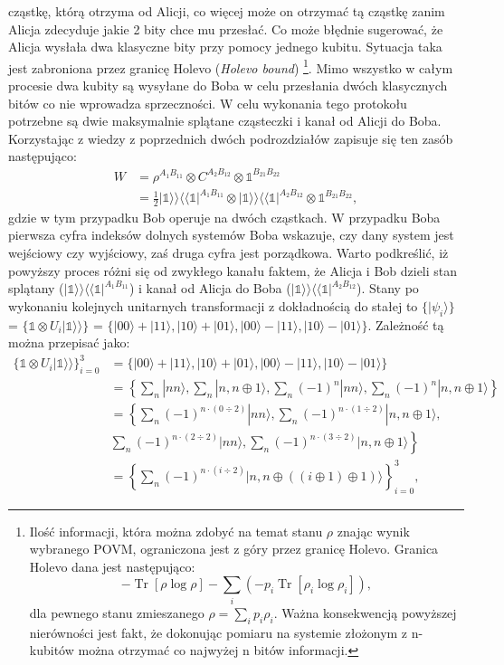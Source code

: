 \documentclass[10pt]{article} %
\DeclareMathOperator{\Trs}{Tr}
\newcommand{\Ket}[1]{|#1\rangle}
\newcommand{\BBra}[1]{\langle\langle#1|}
\newcommand{\KKet}[1]{|#1\rangle\rangle}
\newcommand{\I}{\mathbb{1}}
\begin{document}
cząstkę, którą otrzyma od Alicji, co więcej może on otrzymać tą cząstkę zanim Alicja zdecyduje jakie 2 bity chce mu przesłać. Co może błędnie sugerować, że Alicja wysłała dwa klasyczne bity przy pomocy jednego kubitu. Sytuacja taka jest zabroniona przez granicę Holevo (\textit{Holevo bound})
\footnote
{
Ilość informacji, która można zdobyć na temat stanu $\rho$ znając wynik wybranego POVM, ograniczona jest z góry przez granicę Holevo. Granica Holevo dana jest następująco:
\[
-\Trs\left[\rho \log \rho\right] - \sum_i \left(-p_i \Trs \left[ \rho_i \log \rho_i \right]\right),
\]
dla pewnego stanu zmieszanego $\rho = \sum_i p_i \rho_i$. Ważna konsekwencją powyższej nierówności jest fakt, że dokonując pomiaru na systemie złożonym z n-kubitów można otrzymać co najwyżej n bitów informacji.
}. Mimo wszystko w całym procesie dwa kubity są wysyłane do Boba w celu przesłania dwóch klasycznych bitów co nie wprowadza sprzeczności.
W celu wykonania tego protokołu potrzebne są dwie maksymalnie splątane cząsteczki i kanał od Alicji do Boba. Korzystając z wiedzy z poprzednich dwóch podrozdziałów zapisuje się ten zasób następująco:
\begin{equation}
\begin{split}
W &=  \rho^{A_1 B_{11}} \otimes C^{A_2 B_{12}} \otimes \I^{B_{21}B_{22}} \\&=\frac{1}{2}\KKet{\I}\BBra{\I}^{A_1B_{11}} \otimes \KKet{\I}\BBra{\I}^{A_2B_{12}} \otimes \I^{B_{21}B_{22}},
\end{split}
\end{equation} gdzie w tym przypadku Bob operuje na dwóch cząstkach. W przypadku Boba pierwsza cyfra indeksów dolnych systemów Boba wskazuje, czy dany system jest wejściowy czy wyjściowy, zaś druga cyfra jest porządkowa. Warto podkreślić, iż powyższy proces różni się od zwykłego kanału faktem, że Alicja i Bob dzieli stan splątany ($\KKet{\I}\BBra{\I}^{A_1B_{11}}$) i kanał od Alicja do Boba ($\KKet{\I}\BBra{\I}^{A_2B_{12}}$).
Stany po wykonaniu kolejnych unitarnych transformacji z dokładnością do stałej to $\{ \Ket{\psi_i} \}$ = $\{\I \otimes U_i \KKet{\I} \}$ = $\{ \Ket{00} + \Ket{11}, \Ket{10} + \Ket{01}, \Ket{00} - \Ket{11}, \Ket{10} - \Ket{01}\}$. Zależność tą można przepisać jako:
\begin{equation}
\begin{split}
\{\I \otimes U_i \KKet{\I} \}_{i=0}^3 &= 
\{ \Ket{00} + \Ket{11}, \Ket{10} + \Ket{01}, \Ket{00} - \Ket{11}, \Ket{10} - \Ket{01}\} \\
& = \left\{ \sum_{n} \Ket{nn}, \sum_{n} \Ket{n,n\oplus 1}, \sum_{n} (-1)^{n} \Ket{nn}, \sum_{n} (-1)^{n} \Ket{n,n\oplus 1} \right\}\\
&= \left\{ \sum_{n} (-1)^{n\cdot (0 \div 2)}\Ket{nn}, \sum_{n} (-1)^{n\cdot (1 \div 2)}\Ket{n,n\oplus 1}, \right.
\\&\sum_{n} (-1)^{n\cdot (2 \div 2)} \Ket{nn},  
\left.\sum_{n} (-1)^{n\cdot (3 \div 2)} \Ket{n,n\oplus 1} \right\} \\
&= \left\{ \sum_{n} (-1)^{n\cdot (i \div 2)} \Ket{n,n\oplus ((i \oplus 1) \oplus 1)} \right\}_{i=0}^3,
\end{split}
\end{equation}
\end{document}
